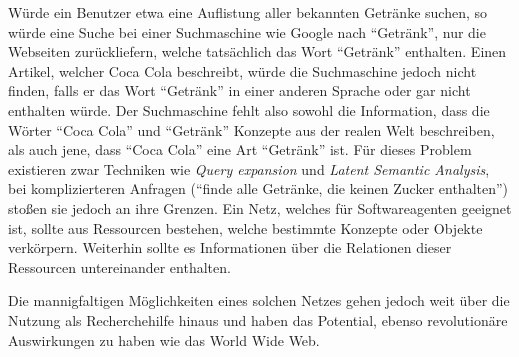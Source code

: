 Würde ein Benutzer etwa eine Auflistung aller bekannten Getränke suchen, so würde eine Suche bei einer Suchmaschine wie Google nach "`Getränk"', nur die Webseiten zurückliefern, 
welche tatsächlich das Wort "`Getränk"' enthalten.
Einen Artikel, welcher Coca Cola beschreibt, würde die Suchmaschine jedoch nicht finden, falls er das Wort "`Getränk"' in einer anderen Sprache oder gar nicht enthalten würde.
Der Suchmaschine fehlt also sowohl die Information, dass die Wörter "`Coca Cola"' und "`Getränk"' Konzepte aus der realen Welt beschreiben, als auch jene,
dass "`Coca Cola"' eine Art "`Getränk"' ist. Für dieses Problem existieren zwar Techniken wie \emph{Query expansion} und \emph{Latent Semantic Analysis},
bei komplizierteren Anfragen ("`finde alle Getränke, die keinen Zucker enthalten"') stoßen sie jedoch an ihre Grenzen. 
Ein Netz, welches für Softwareagenten geeignet ist, sollte aus Ressourcen bestehen, welche bestimmte Konzepte oder Objekte verkörpern.
Weiterhin sollte es Informationen über die Relationen dieser Ressourcen untereinander enthalten.

Die mannigfaltigen Möglichkeiten eines solchen Netzes gehen jedoch weit über die Nutzung als Recherchehilfe hinaus und haben
das Potential, ebenso revolutionäre Auswirkungen zu haben wie das World Wide Web.%



